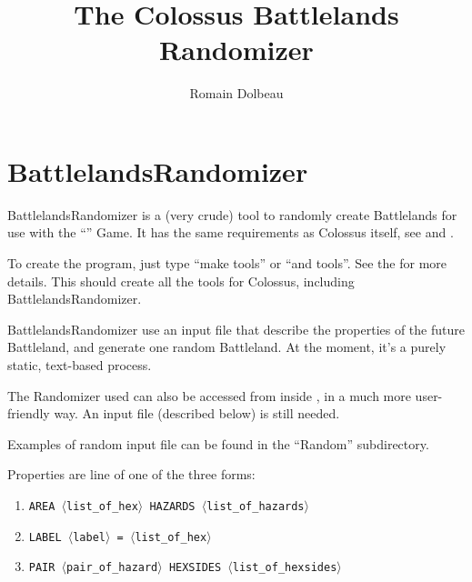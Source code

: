 \documentclass{article}
\begin{document}

\title{The Colossus Battlelands Randomizer}

\author{Romain Dolbeau}

\maketitle

\section{BattlelandsRandomizer}

BattlelandsRandomizer is a (very crude) tool to randomly
create Battlelands for use with the
``'' Game.
It has the same requirements as Colossus itself, see
and
.

To create the program, just type ``make tools'' or ``and tools''.
See the
for more details.
This should create all the tools for Colossus, including
BattlelandsRandomizer.

BattlelandsRandomizer use an input file that describe
the properties of the future Battleland, and generate
one random Battleland. At the moment, it's a purely
static, text-based process.

The Randomizer used can also be accessed from inside
,
in a much more user-friendly way. An input file (described below) is
still needed.

Examples of random input file can be found in the
``Random'' subdirectory.

Properties are line of one of the three forms:

\begin{enumerate}

\item \texttt{AREA $\langle$list\_of\_hex$\rangle$ HAZARDS $\langle$list\_of\_hazards$\rangle$}
\item \texttt{LABEL $\langle$label$\rangle$ = $\langle$list\_of\_hex$\rangle$}
\item \texttt{PAIR $\langle$pair\_of\_hazard$\rangle$ HEXSIDES $\langle$list\_of\_hexsides$\rangle$}

\end{enumerate}
\end{document}
